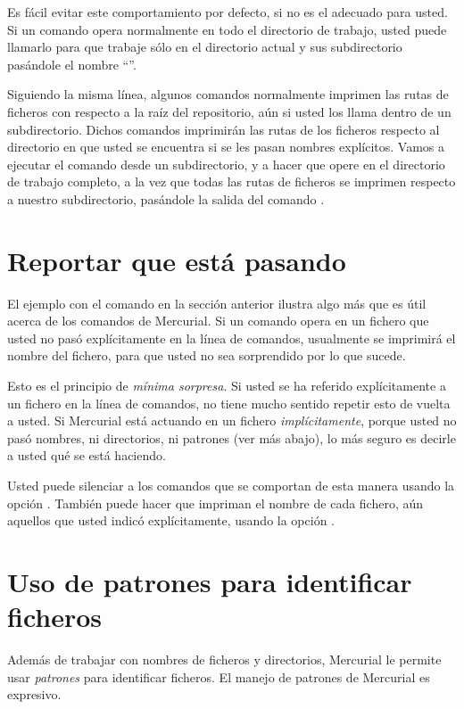 Es fácil evitar este comportamiento por defecto, si no es el adecuado
para usted. Si un comando opera normalmente en todo el directorio de
trabajo, usted puede llamarlo para que trabaje sólo en el directorio
actual y sus subdirectorio pasándole el nombre ``''.

Siguiendo la misma línea, algunos comandos normalmente imprimen las
rutas de ficheros con respecto a la raíz del repositorio, aún si usted
los llama dentro de un subdirectorio. Dichos comandos imprimirán las
rutas de los ficheros respecto al directorio en que usted se encuentra
si se les pasan nombres explícitos. Vamos a ejecutar el comando
 desde un subdirectorio, y a hacer que opere en el
directorio de trabajo completo, a la vez que todas las rutas de
ficheros se imprimen respecto a nuestro subdirectorio, pasándole la
salida del comando .

\section{Reportar que está pasando}

El ejemplo con el comando  en la sección anterior ilustra
algo más que es útil acerca de los comandos de Mercurial. Si un
comando opera en un fichero que usted no pasó explícitamente en la
línea de comandos, usualmente se imprimirá el nombre del fichero, para
que usted no sea sorprendido por lo que sucede.

Esto es el principio de \emph{mínima sorpresa}. Si usted se ha
referido explícitamente a un fichero en la línea de comandos, no tiene
mucho sentido repetir esto de vuelta a usted. Si Mercurial está
actuando en un fichero \emph{implícitamente}, porque usted no pasó
nombres, ni directorios, ni patrones (ver más abajo), lo más seguro es
decirle a usted qué se está haciendo.

Usted puede silenciar a los comandos que se comportan de esta manera
usando la opción .  También puede hacer que impriman el
nombre de cada fichero, aún aquellos que usted indicó explícitamente,
usando la opción .

\section{Uso de patrones para identificar ficheros}

Además de trabajar con nombres de ficheros y directorios, Mercurial le
permite usar \emph{patrones} para identificar ficheros. El manejo de
patrones de Mercurial es expresivo.

